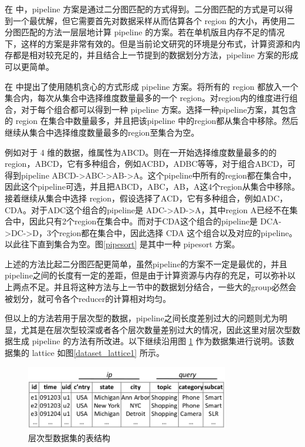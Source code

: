 在 \cite{agarwal1996computation} 中，pipeline 方案是通过二分图匹配的方式得到。二分图匹配的方式是可以得到一个最优解，但它需要首先对数据采样从而估算各个 region 的大小，再使用二分图匹配的方法一层层地计算 pipeline 的方案。若在单机版且内存不足的情况下，这样的方案是非常有效的。但是当前论文研究的环境是分布式，计算资源和内存都是相对较充足的，并且结合上一节提到的数据划分方法，pipeline 方案的形成可以更简单。

在\cite{wang2013scalable} 中提出了使用随机贪心的方式形成 pipeline 方案。将所有的 region 都放入一个集合内，每次从集合中选择维度数量最多的一个 region。对region内的维度进行组合，对于每个组合都可以得到一种 pipeline 方案。选择一种pipeline方案，其包含的 region 在集合中数量最多，并且把该pipeline 中的region都从集合中移除。然后继续从集合中选择维度数量最多的region至集合为空。

例如对于 4 维的数据，维属性为ABCD。则在一开始选择维度数量最多的的 region，ABCD，它有多种组合，例如ACBD，ADBC等等，对于组合ABCD，可得到pipeline ABCD-\textgreater ABC-\textgreater AB-\textgreater A。这个pipeline中所有的region都在集合中，因此这个pipeline可选，并且把ABCD，ABC，AB，A这4个region从集合中移除。接着继续从集合中选择 region，假设选择了ACD，它有多种组合，例如ADC，CDA。对于ADC这个组合的pipeline是  ADC-\textgreater AD-\textgreater A，其中region A已经不在集合中，因此只有2个region在集合中。而对于CDA这个组合的pipeline是  DCA-\textgreater DC-\textgreater D，3个region都在集合中，因此选择 CDA 这个组合以及对应的pipeline。以此往下直到集合为空。图\ref{pipesort} 是其中一种 pipesort 方案。

上述的方法比起二分图匹配更简单，虽然pipeline的方案不一定是最优的，并且pipeline之间的长度有一定的差距，但是由于计算资源与内存的充足，可以弥补以上两点不足。并且将这种方法与上一节中的数据划分结合，一些大的group必然会被划分，就可令各个reducer的计算相对均匀。

但以上的方法若用于层次型的数据，pipeline之间长度差别过大的问题则尤为明显，尤其是在层次型较深或者各个层次数量差别过大的情况，因此这里对层次型数据生成 pipeline 的方法有所改进。以下继续沿用图 \ref{dataset_table1} 作为数据集进行说明。该数据集的 lattice 如图\ref{dataset_lattice1} 所示。


\begin{figure}[!htb]
\centering\includegraphics[width=3.5in]{picture/ch_datacube_mr/dataset_table} 
\caption{层次型数据集的表结构}\label{dataset_table1} 
\end{figure} 

